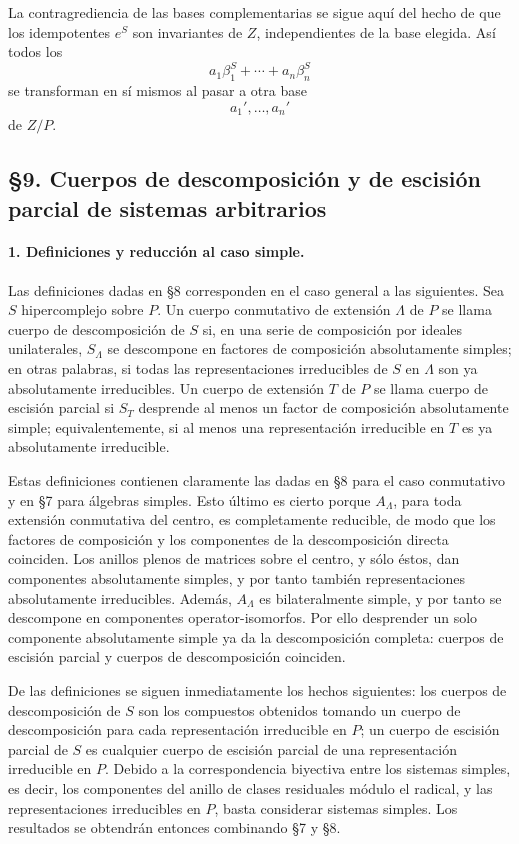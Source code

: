 La contragrediencia de las bases complementarias se sigue aquí del hecho de que los idempotentes \(e^S\) son invariantes de \(Z\), independientes de la base elegida. Así todos los
\[
        a_1\beta_1^S+\cdots+a_n\beta_n^S
\]
se transforman en sí mismos al pasar a otra base
\[
        a_1',\ldots,a_n'
\]
de \(Z/P\).

\subsection*{§9. Cuerpos de descomposición y de escisión parcial de sistemas arbitrarios}

\paragraph{1. Definiciones y reducción al caso simple.}
Las definiciones dadas en §8 corresponden en el caso general a las siguientes. Sea \(S\) hipercomplejo sobre \(P\). Un cuerpo conmutativo de extensión \(\Lambda\) de \(P\) se llama cuerpo de descomposición de \(S\) si, en una serie de composición por ideales unilaterales, \(S_\Lambda\) se descompone en factores de composición absolutamente simples; en otras palabras, si todas las representaciones irreducibles de \(S\) en \(\Lambda\) son ya absolutamente irreducibles. Un cuerpo de extensión \(T\) de \(P\) se llama cuerpo de escisión parcial si \(S_T\) desprende al menos un factor de composición absolutamente simple; equivalentemente, si al menos una representación irreducible en \(T\) es ya absolutamente irreducible.

Estas definiciones contienen claramente las dadas en §8 para el caso conmutativo y en §7 para álgebras simples. Esto último es cierto porque \(A_\Lambda\), para toda extensión conmutativa del centro, es completamente reducible, de modo que los factores de composición y los componentes de la descomposición directa coinciden. Los anillos plenos de matrices sobre el centro, y sólo éstos, dan componentes absolutamente simples, y por tanto también representaciones absolutamente irreducibles. Además, \(A_\Lambda\) es bilateralmente simple, y por tanto se descompone en componentes operator-isomorfos. Por ello desprender un solo componente absolutamente simple ya da la descomposición completa: cuerpos de escisión parcial y cuerpos de descomposición coinciden.

De las definiciones se siguen inmediatamente los hechos siguientes: los cuerpos de descomposición de \(S\) son los compuestos obtenidos tomando un cuerpo de descomposición para cada representación irreducible en \(P\); un cuerpo de escisión parcial de \(S\) es cualquier cuerpo de escisión parcial de una representación irreducible en \(P\). Debido a la correspondencia biyectiva entre los sistemas simples, es decir, los componentes del anillo de clases residuales módulo el radical, y las representaciones irreducibles en \(P\), basta considerar sistemas simples. Los resultados se obtendrán entonces combinando §7 y §8.

